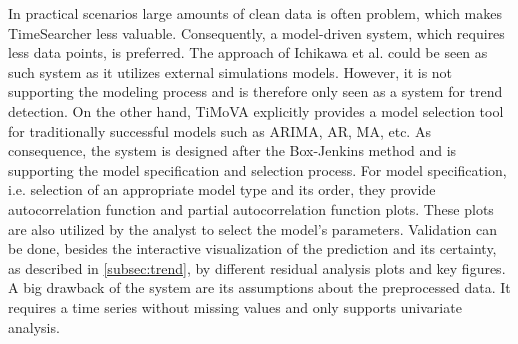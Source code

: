 \documentclass[electronic]{vgtc}             %
\begin{document}
In practical scenarios large amounts of clean data is often problem, which makes  TimeSearcher \cite{Hochheiser:2004, buono:2005, buono:2007} less valuable.
Consequently, a model-driven system, which requires less data points, is preferred.
The approach of Ichikawa et al. \cite{ichikawa:2002} could be seen as such system as it utilizes external simulations models.
However, it is not supporting the modeling process and is therefore only seen as a system for trend detection.
On the other hand, TiMoVA \cite{boegl:2013} explicitly provides a model selection tool for traditionally successful models such as ARIMA, AR, MA, etc.
As consequence, the system is designed after the Box-Jenkins method and is supporting the model specification and selection process.
For model specification, i.e. selection of an appropriate model type and its order, they provide autocorrelation function and partial autocorrelation function plots.
These plots are also utilized by the analyst to select the model's parameters.
Validation can be done, besides the interactive visualization of the prediction and its certainty, as described in \autoref{subsec:trend}, by different residual analysis plots and key figures.
A big drawback of the system are its assumptions about the preprocessed data. 
It requires a time series without missing values and only supports univariate analysis.
\end{document}
